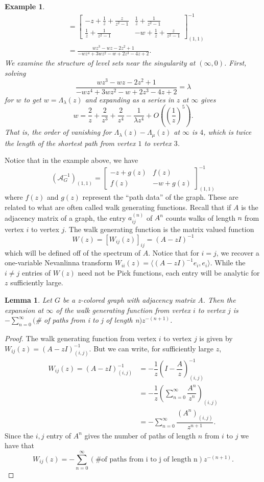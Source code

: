 \documentclass[12pt]{amsart}
\newtheorem{lemma}[theorem]{Lemma}
\newtheorem{example}[theorem]{Example}
\theoremstyle{remark}
\newcommand{\A}{\mathcal{A}}
\newcommand{\inv}{^{-1}}
\newcommand\la{\lambda}
\newcommand\bbm{\begin{bmatrix}}
\newcommand\ebm{\end{bmatrix}}
\numberwithin{equation}{section}
\begin{document}
\begin{example}
\begin{align*}
&= \bbm -z + \frac{1}{z} + \frac{z}{z^2-1} & \frac{1}{z} + \frac{1}{z^2 - 1} \\   \frac{1}{z} + \frac{1}{z^2 - 1} & -w + \frac{1}{z} + \frac{z}{z^2 - 1} \ebm\inv_{(1,1)} \\
&= \frac{w z^3-w z-2 z^2+1}{-w z^4+3 w z^2-w+2 z^3-4 z+2}.
\end{align*}
We examine the structure of level sets near the singularity at $(\infty,0)$. First, solving
\[
\frac{w z^3-w z-2 z^2+1}{-w z^4+3 w z^2-w+2 z^3-4 z+2} = \la
\]
for $w$ to get $w = \Lambda_\la(z)$ and expanding as a series in $z$ at $\infty$ gives
\[
w = \frac{2}{z} + \frac{2}{z^3} +\frac{2}{z^4} - \frac{1}{\la z^4} + O\left(\left(\frac{1}{z}\right)^5\right).
\]
That is, the order of vanishing for $\Lambda_\la(z) - \Lambda_\mu(z)$ at $\infty$ is $4$, which is twice the length of the shortest path from vertex $1$ to vertex $3$.
\end{example}

Notice that in the example above, we have
\[ 
(\A_G\inv)_{(1,1)} = \bbm -z + g(z) & f(z) \\   f(z) & -w + g(z) \ebm\inv_{(1,1)}
\]
where $f(z)$ and $g(z)$ represent the ``path data'' of the graph. These are related to what are often called walk generating functions. Recall that if $A$ is the adjacency matrix of a graph, the entry $a^{(n)}_{ij}$ of $A^n$ counts walks of length $n$ from vertex $i$ to vertex $j$. The walk generating function is the matrix valued function
\[
W(z) = [W_{ij}(z)]_{ij} = (A - z I)\inv
\]
which will be defined off of the spectrum of $A$. Notice that for $i = j$, we recover a one-variable Nevanlinna transform $W_{ii}(z) = \langle(A- zI)\inv e_i, e_i \rangle$. While the $i\neq j$ entries of $W(z)$ need not be Pick functions, each entry will be analytic for $z$ sufficiently large. 

\begin{lemma} \label{pathfunctionlemma}
    Let $G$ be a z-colored graph with adjacency matrix A. Then the expansion at $\infty$ of the walk generating function from vertex $i$ to vertex $j$ is $-\sum_{n = 0}^{\infty} ($\# of paths from i to j of length n$)z^{-(n+1)}$.
\end{lemma}

\begin{proof}
    The walk generating function from vertex $i$ to vertex $j$ is given by $W_{ij}(z) = (A-zI)^{-1}_{(i,j)}$. But we can write, for sufficiently large $z$,
    \begin{align*}
        W_{ij}(z) = (A-zI)^{-1}_{(i,j)} &= -\dfrac{1}{z} \left(I-\dfrac{A}{z}\right)^{-1}_{(i,j)} \\
        &= -\dfrac{1}{z} \left(\sum_{n=0}^{\infty} \dfrac{A^n}{z^n}\right)_{(i,j)} \\
        &= -\sum_{n=0}^{\infty} \dfrac{(A^n)_{(i,j)}}{z^{n+1}}.
    \end{align*}
    Since the $i,j$ entry of $A^n$ gives the number of paths of length $n$ from $i$ to $j$ we have that $$W_{ij}(z) = -\sum_{n = 0}^{\infty} (\text{\# of paths from i to j of length n})z^{-(n+1)}.$$
\end{proof}
\end{document}
